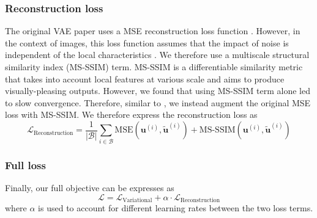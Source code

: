\documentclass{article}
\begin{document}
\subsubsection{Reconstruction loss}
The original VAE paper uses a MSE reconstruction loss function \citep{kingma}. However, in the context of images, this loss function assumes that the impact of noise is independent of the local characteristics \citep{zhao2}. We therefore use a multiscale structural similarity index (MS-SSIM) term. MS-SSIM is a differentiable similarity metric that takes into account local features at various scale \citep{zhao2} and aims to produce visually-pleasing outputs. However, we found that using MS-SSIM term alone led to slow convergence. Therefore, similar to \citet{zhao2}, we instead augment the original MSE loss with MS-SSIM. We therefore express the reconstruction loss as
\begin{equation}
  \mathcal{L}_{\text{Reconstruction}}
    = \frac{1}{\left|\mathcal{B}\right|} \sum_{i \in \mathcal{B}}
    \text{MSE}\left(
      \mathbf{u}^{(i)},
      \mathbf{\tilde{u}}^{(i)}
    \right)
    + \text{MS-SSIM}\left(
      \mathbf{u}^{(i)},
      \mathbf{\tilde{u}}^{(i)}
    \right)
\end{equation}

\subsubsection{Full loss}
Finally, our full objective can be expresses as
\begin{equation}
  \mathcal{L}
  = \mathcal{L}_{\text{Variational}}
  + \alpha\cdot \mathcal{L}_{\text{Reconstruction}}
\end{equation}
where $\alpha$ is used to account for different learning rates between the two loss terms.
\end{document}
